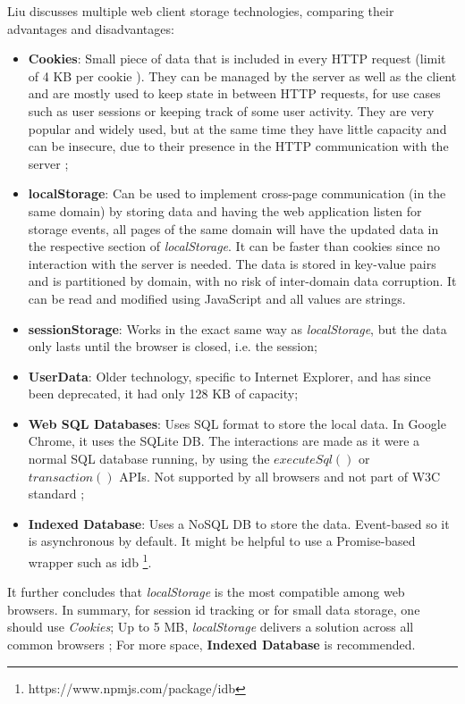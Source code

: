 Liu \cite{Liu2014} discusses multiple web client storage technologies, comparing their advantages and disadvantages:
\begin{itemize}
    \item \textbf{Cookies}: Small piece of data that is included in every HTTP request (limit of 4 KB per cookie \cite{cookies-rfc}). They can be managed by the server as well as the client and are mostly used to keep state in between HTTP requests, for use cases such as user sessions or keeping track of some user activity. They are very popular and widely used, but at the same time they have little capacity and can be insecure, due to their presence in the HTTP communication with the server \cite{Velagapudi2019} \cite{Kwon2020};
    \item \textbf{localStorage}: Can be used to implement cross-page communication (in the same domain) by storing data and having the web application listen for storage events, all pages of the same domain will have the updated data in the respective section of \textit{localStorage}. It can be faster than cookies since no interaction with the server is needed.
    The data is stored in key-value pairs and is partitioned by domain, with no risk of inter-domain data corruption. It can be read and modified using JavaScript and all values are strings.
    \item \textbf{sessionStorage}: Works in the exact same way as \textit{localStorage}, but the data only lasts until the browser is closed, i.e. the session;
    \item \textbf{UserData}: Older technology, specific to Internet Explorer, and has since been deprecated, it had only 128 KB of capacity;
    \item \textbf{Web SQL Databases}: Uses SQL format to store the local data. In Google Chrome, it uses the SQLite DB. The interactions are made as it were a normal SQL database running, by using the $executeSql()$ or $transaction()$ APIs. Not supported by all browsers and not part of W3C standard \cite{WebSQL-storage-w3c};
    \item \textbf{Indexed Database}: Uses a NoSQL DB to store the data. Event-based so it is asynchronous by default. It might be helpful to use a Promise-based wrapper \cite{promises-js-mdn} such as idb \footnote{https://www.npmjs.com/package/idb}.
\end{itemize}
It further concludes that \textit{localStorage} is the most compatible among web browsers. In summary, for session id tracking or for small data storage, one should use \textit{Cookies}; Up to 5 MB, \textit{localStorage} delivers a solution across all common browsers \cite{webstorage-w3c}; For more space, \textbf{Indexed Database} is recommended.

